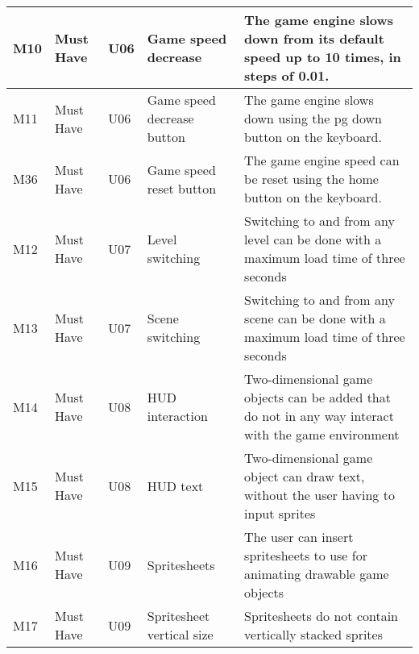 \documentclass{article} %
\begin{document}
\begin{longtable}{|p{}|p{}|p{}|p{}|p{}|}
    M10                         & Must Have                          & U06                & Game speed decrease         & The game engine slows down from its default speed up to 10 times, in steps of 0.01.                                                                 \\ \hline
    M11                         & Must Have                          & U06                & Game speed decrease button  & The game engine slows down using the pg down button on the keyboard.                                                                                    \\ \hline
    M36 & Must Have & U06 & Game speed reset button & The game engine speed can be reset using the home button on the keyboard. \\ \hline
    M12                         & Must Have                          & U07                & Level switching             & Switching to and from any level can be done with a maximum load time of three seconds                                                                       \\ \hline
    M13                         & Must Have                          & U07                & Scene switching             & Switching to and from any scene can be done with a maximum load time of three seconds                                                                       \\ \hline
    M14                         & Must Have                          & U08                & HUD interaction             & Two-dimensional game objects can be added that do not in any way interact with the game environment                                                         \\ \hline
    M15                         & Must Have                          & U08                & HUD text                    & Two-dimensional game object can draw text, without the user having to input sprites                                                                         \\ \hline
    M16                         & Must Have                          & U09                & Spritesheets                & The user can insert spritesheets to use for animating drawable game objects                                                                                 \\ \hline
    M17                         & Must Have                          & U09                & Spritesheet vertical size   & Spritesheets do not contain vertically stacked sprites                                                                                                   \\ \hline

\end{longtable}
\end{document}
